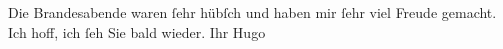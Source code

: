 \begin{ledgroupsized}[t]{13cm}
           \pstart
           {\pb}Die Brandesabende waren ſehr hübſch und haben mir ſehr viel Freude
               gemacht. Ich hoff, ich ſeh Sie bald wieder.\pend
           \pstart Ihr \spacefill\mbox{Hugo}\pend{}\endnumbering{}\end{ledgroupsized}  \newcommand{\dateiname}{L00771}\newcommand{\titel}{Hugo von Hofmannsthal an Arthur Schnitzler, [30. 1. 1898]}\newcommand{\editorInnen}{Martin Anton Müller und Gerd-Hermann Susen}
            \footnotesize
\begin{ledgroupsized}[t]{11.5cm}
\end{ledgroupsized}
         
      